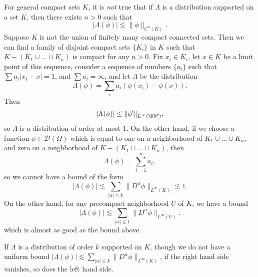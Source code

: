 \begin{remark}
    For general compact sets $K$, it is \emph{not} true that if $\Lambda$ is a distribution supported on a set $K$, then there exists $n > 0$ such that
    \[ |\Lambda(\phi)| \lesssim \| \phi \|_{C^n(K)}. \]
    Suppose $K$ is not the union of finitely many compact connected sets. Then we can find a family of disjoint compact sets $\{ K_i \}$ in $K$ such that $K - (K_1 \cup \dots \cup K_n)$ is compact for any $n > 0$. Fix $x_i \in K_i$, let $x \in K$ be a limit point of this sequence, consider a sequence of numbers $\{ a_i \}$ such that $\sum a_i |x_i - x| = 1$, and $\sum a_i = \infty$, and let $\Lambda$ be the distribution
    \[ \Lambda(\phi) = \sum_i a_i (\phi(x_i) - \phi(x)). \]
    Then
    \[ |\Lambda(\phi)| \leq \| \phi' \|_{L^\infty(\RR^d)}, \]
    so $\Lambda$ is a distribution of order at most 1. On the other hand, if we choose a function $\phi \in \mathcal{D}(\Omega)$ which is equal to one on a neighborhood of $K_1 \cup \dots \cup K_n$, and zero on a neighborhood of $K - (K_1 \cup \dots \cup K_n)$, then
    \[ \Lambda(\phi) = \sum_{i = 1}^n a_i, \]
    so we cannot have a bound of the form
    \[ |\Lambda(\phi)| \lesssim \sum_{|\alpha| \leq k} \| D^\alpha \phi \|_{L^\infty(K)} \lesssim 1. \]
    On the other hand, for any precompact neighborhood $U$ of $K$, we have a bound
    \[ |\Lambda(\phi)| \lesssim \sum_{|\alpha| \leq 1} \| D^\alpha \phi \|_{L^\infty(U)}. \]
    which is almost as good as the bound above.
\end{remark}

If $\Lambda$ is a distribution of order $k$ supported on $K$, though we do not have a uniform bound $|\Lambda(\phi)| \lesssim \sum_{|\alpha| \leq k} \| D^\alpha \phi \|_{L^\infty(K)}$, if the right hand side vanishes, so does the left hand side.

